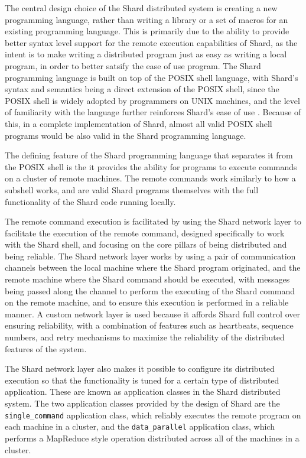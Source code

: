 \documentclass[twoside]{report}
\begin{document}
The central design choice of the Shard distributed system is creating a new programming language, rather than writing a library or a set of macros for an existing programming language.
This is primarily due to the ability to provide better syntax level support for the remote execution capabilities of Shard, as the intent is to make writing a distributed program just as easy as writing a local program, in order to better satsify the ease of use program.
The Shard programming language is built on top of the POSIX shell language, with Shard's syntax and semantics being a direct extension of the POSIX shell, since the POSIX shell is widely adopted by programmers on UNIX machines, and the level of familiarity with the language further reinforces Shard's ease of use \cite{posix2017}.
Because of this, in a complete implementation of Shard, almost all valid POSIX shell programs would be also valid in the Shard programming language.

The defining feature of the Shard programming language that separates it from the POSIX shell is the it provides the ability for programs to execute commands on a cluster of remote machines.
The remote commands work similarly to how a subshell works, and are valid Shard programs themselves with the full functionality of the Shard code running locally.

The remote command execution is facilitated by using the Shard network layer to facilitate the execution of the remote command, designed specifically to work with the Shard shell, and focusing on the core pillars of being distributed and being reliable.
The Shard network layer works by using a pair of communication channels between the local machine where the Shard program originated, and the remote machine where the Shard command should be executed, with messages being passed along the channel to perform the executing of the Shard command on the remote machine, and to ensure this execution is performed in a reliable manner.
A custom network layer is used because it affords Shard full control over ensuring reliability, with a combination of features such as heartbeats, sequence numbers, and retry mechanisms to maximize the reliability of the distributed features of the system.

The Shard network layer also makes it possible to configure its distributed execution so that the functionality is tuned for a certain type of distributed application.
These are known as application classes in the Shard distributed system.
The two application classes provided by the design of Shard are the \texttt{single\_command} application class, which reliably executes the remote program on each machine in a cluster, and the \texttt{data\_parallel} application class, which performs a MapReduce \cite{dean2004mapreduce} style operation distributed across all of the machines in a cluster.
\end{document}
